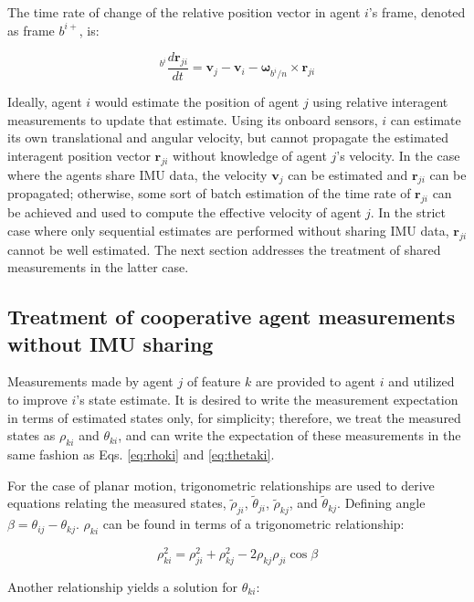 \documentclass{aiaa-tc}
\newcommand{\B}[1]{\textbf{#1}} %
\newcommand{\BG}[1]{{\bm #1}}           %
\newcommand{\ddarg}[2]{\frac{d#1}{d#2}} %
\begin{document}
The time rate of change of the relative position vector in agent $i$'s frame, denoted as frame $b^{i+}$, is:

\begin{equation}
{}^{b^i} \ddarg{\B{r}_{ji}}{t} = \B{v}_j-\B{v}_i-\BG{\omega}_{b^i/n} \times \B{r}_{ji}
\end{equation}

Ideally, agent $i$ would estimate the position of agent $j$ using relative interagent measurements to update that estimate. Using its onboard sensors, $i$ can estimate its own translational and angular velocity, but cannot propagate the estimated interagent position vector $\B{r}_{ji}$ without knowledge of agent $j$'s velocity. In the case where the agents share IMU data, the velocity $\B{v}_j$ can be estimated and $\B{r}_{ji}$ can be propagated; otherwise, some sort of batch estimation of the time rate of $\B{r}_{ji}$ can be achieved and used to compute the effective velocity of agent $j$. In the strict case where only sequential estimates are performed without sharing IMU data, $\B{r}_{ji}$ cannot be well estimated. The next section addresses the treatment of shared measurements in the latter case.

\subsection{Treatment of cooperative agent measurements without IMU sharing}

Measurements made by agent $j$ of feature $k$ are provided to agent $i$ and utilized to improve $i$'s state estimate. It is desired to write the measurement expectation in terms of estimated states only, for simplicity; therefore, we treat the measured states as $\rho_{ki}$ and $\theta_{ki}$, and can write the expectation of these measurements in the same fashion as Eqs. \ref{eq:rhoki} and \ref{eq:thetaki}.

For the case of planar motion, trigonometric relationships are used to derive equations relating the measured states, $\tilde{\rho}_{ji}$, $\tilde{\theta}_{ji}$, $\tilde{\rho}_{kj}$, and $\tilde{\theta}_{kj}$. Defining angle $\beta =\theta_{ij}-\theta_{kj}$. $\rho_{ki}$ can be found in terms of a trigonometric relationship:

\begin{equation}
\rho_{ki}^2 = \rho_{ji}^2+\rho_{kj}^2 - 2\rho_{kj}\rho_{ji}\cos{\beta}
\label{eq:lawCos}
\end{equation}

Another relationship yields a solution for $\theta_{ki}$:
\end{document}
